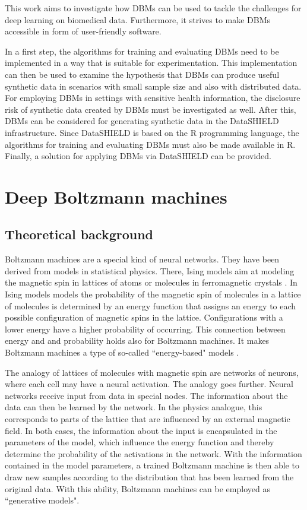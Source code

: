 \documentclass[12pt]{article}
\begin{document}
This work aims to investigate how DBMs can be used to tackle the challenges for deep learning on biomedical data. Furthermore, it strives to make DBMs accessible in form of user-friendly software.

In a first step, the algorithms for training and evaluating DBMs need to be implemented in a way that is suitable for experimentation.
This implementation can then be used to examine the hypothesis that DBMs can produce useful synthetic data in scenarios with small sample size and also with distributed data.
For employing DBMs in settings with sensitive health information, the disclosure risk of synthetic data created by DBMs must be investigated as well.
After this, DBMs can be considered for generating synthetic data in the DataSHIELD infrastructure.
Since DataSHIELD is based on the R programming language, the algorithms for training and evaluating DBMs must also be made available in R.
Finally, a solution for applying DBMs via DataSHIELD can be provided.


\clearpage
\section{Deep Boltzmann machines}
\subsection{Theoretical background}\label{bmtheory}

Boltzmann machines \citep{ackley_boltzmann_1985} are a special kind of neural networks.
They have been derived from models in statistical physics.
There, Ising models aim at modeling the magnetic spin in lattices of atoms or molecules in ferromagnetic crystals \citep{isingmodel}.
In Ising models models the probability of the magnetic spin of molecules in a lattice of molecules is determined by an energy function that assigns an energy to each possible configuration of magnetic spins in the lattice.
Configurations with a lower energy have a higher probability of occurring.
This connection between energy and and probability holds also for Boltzmann machines.
It makes Boltzmann machines a type of so-called ``energy-based" models \citep{ranzato_ebm}.

The analogy of lattices of molecules with magnetic spin are networks of neurons, where each cell may have a neural activation.
The analogy goes further.
Neural networks receive input from data in special nodes.
The information about the data can then be learned by the network.
In the physics analogue, this corresponds to parts of the lattice that are influenced by an external magnetic field.
In both cases, the information about the input is encapsulated in the parameters of the model, which influence the energy function and thereby determine the probability of the activations in the network.
With the information contained in the model parameters, a trained Boltzmann machine is then able to draw new samples according to the distribution that has been learned from the original data.
With this ability, Boltzmann machines can be employed as ``generative models".
\end{document}
